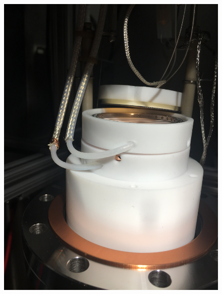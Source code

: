 \begin{figure}[htbp]
    \begin{minipage}{0.33\textwidth}
    \includegraphics[width=\linewidth]{figures/testbed/ft6_1.jpg}
    \end{minipage}
    \hspace{\fill} %
    \begin{minipage}{0.33\textwidth}

\end{minipage}
\end{figure}
